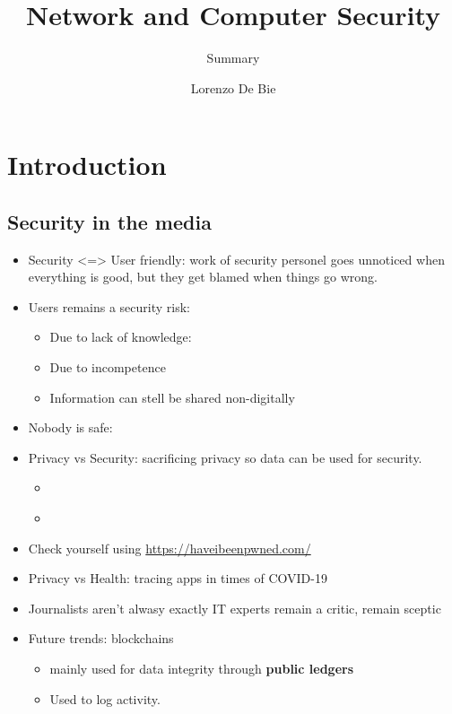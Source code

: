 \documentclass[11pt,british,faculty=ea,layout=titlefont,underline=false,titleUppercase=true,titleUnderline=true,hidelinks]{ugent2016-report}
\title{Network and Computer Security}
\subtitle{Summary}
\author{Lorenzo De Bie}
\begin{document}
\maketitle
\tableofcontents

\chapter{Introduction} \label{cha:introduction}
\section{Security in the media} \label{sec:security-in-the-media}
	\begin{itemize}
		\item Security <=> User friendly: work of security personel goes unnoticed when everything is good, but they get blamed when things go wrong.
		\item Users remains a security risk:
			\begin{itemize}
				\item Due to lack of knowledge:  \cite{Rodriguez2014}
				\item Due to incompetence
				\item Information can stell be shared non-digitally
			\end{itemize}
		\item Nobody is safe:  \cite{Eeckhaut2014}
		\item Privacy vs Security: sacrificing privacy so data can be used for security.
			\begin{itemize}
				\item {} \cite{Derix2013}
				\item {} \cite{Follorou2013}
			\end{itemize}
		\item Check yourself using \url{https://haveibeenpwned.com/}
		\item Privacy vs Health: tracing apps in times of COVID-19
		\item Journalists aren't alwasy exactly IT experts \rightarrow remain a critic, remain sceptic
		\item Future trends: blockchains
			\begin{itemize}
				\item mainly used for data integrity through \textbf{public ledgers}
				\item Used to log activity.
					\begin{itemize}

\end{itemize}
\end{itemize}
\end{itemize}
\end{document}
